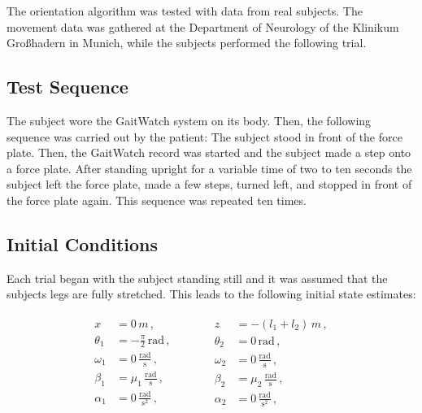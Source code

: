 The orientation algorithm was tested with data from real subjects. The movement data was gathered at the Department of Neurology of the Klinikum Großhadern in Munich, while the subjects performed the following trial.

\subsection{Test Sequence}

The subject wore the GaitWatch system on its body. Then, the following sequence was carried out by the patient: The subject stood in front of the force plate. Then, the GaitWatch record was started and the subject made a step onto a force plate. After standing upright for a variable time of two to ten seconds the subject left the force plate, made a few steps, turned left, and stopped in front of the force plate again. This sequence was repeated ten times.

\subsection{Initial Conditions}

Each trial began with the subject standing still and it was assumed that the subjects legs are fully stretched. This leads to the following initial state estimates:

\begin{equation}
\begin{matrix}
	\begin{split}
	  x &= 0\,m\,, \\
	  \theta_1 &= -\frac{\pi}{2}\,\mbox{rad}\,, \\
	  \omega_1 &= 0\,\frac{\mbox{rad}}{\mbox{s}}\,, \\
	  \beta_1 &= \mu_1\,\frac{\mbox{rad}}{\mbox{s}}\,, \\
	  \alpha_1 &= 0\,\frac{\mbox{rad}}{\mbox{s}^2}\,,
\end{split} \qquad \quad
    \begin{split}
   	  z &= -(l_1+l_2)\,m\,, \\
	  \theta_2 &= 0\,\mbox{rad}\,, \mathrel{\phantom{\frac{\pi}{2}}}\\
	  \omega_2 &= 0\,\frac{\mbox{rad}}{\mbox{s}}\,, \\
	  \beta_2 &= \mu_2\,\frac{\mbox{rad}}{\mbox{s}}\,, \\
	  \alpha_2 &= 0\,\frac{\mbox{rad}}{\mbox{s}^2}\,,  
\end{split}
\end{matrix}
\end{equation}

